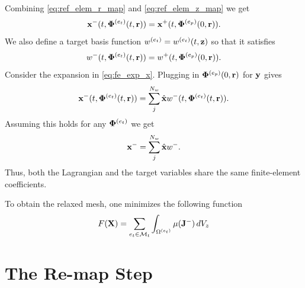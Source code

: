 \documentclass[11pt]{report}
\begin{document}
Combining \cref{eq:ref_elem_r_map} and \cref{eq:ref_elem_z_map} we get
\begin{equation}
    \mathbf{x}^-(t,\bm \Phi^{(e_t)}(t,\mathbf{r})) = \mathbf{x}^+(t, \bm \Phi^{(e_p)}(0,\mathbf{r})).
\end{equation}
We also define a target basis function $w^{(e_t)} = w^{(e_t)}(t,\mathbf{z})$ so that it satisfies
\begin{equation}
    w^-(t,\bm \Phi^{(e_t)}(t,\mathbf{r})) = w^+(t, \bm \Phi^{(e_p)}(0,\mathbf{r})).
\end{equation}
Consider the expansion in \cref{eq:fe_exp_x}. Plugging in $\bm \Phi^{(e_p)}(0,\mathbf{r})$ for $\mathbf{y}$ gives
\begin{equation}
    \mathbf{x}^-(t,\bm \Phi^{(e_t)}(t,\mathbf{r})) = \sum_j^{N_w} \hat{\mathbf{x}} w^-(t,\bm \Phi^{(e_t)}(t,\mathbf{r})).
\end{equation}
Assuming this holds for any $\bm \Phi^{(e_t)}$ we get
\begin{equation}
    \mathbf{x}^- = \sum_j^{N_w} \hat{\mathbf{x}} w^-.
\end{equation}
Thus, both the Lagrangian and the target variables share the same finite-element coefficients.

To obtain the relaxed mesh, one minimizes the following function
\begin{equation}
    F(\mathbf{X}) = \sum_{e_t \in \mathcal{M}_t} \int_{\Omega^{(e_t)}} \mu( \mathbf{J}^- ) \, dV_z
\end{equation}

\chapter{The Re-map Step}



\end{document}
